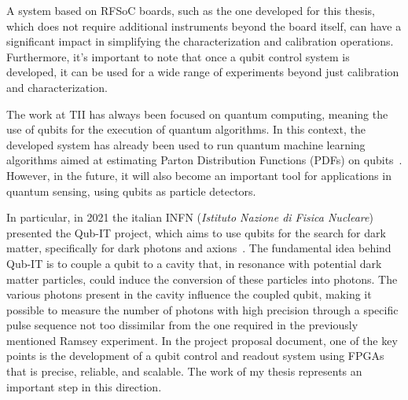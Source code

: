 %
A system based on RFSoC boards, such as the one developed for this thesis, which does not require additional instruments beyond the board itself, can have a significant impact in simplifying the characterization and calibration operations.\\
Furthermore, it's important to note that once a qubit control system is developed, it can be used for a wide range of experiments beyond just calibration and characterization.

%
The work at TII has always been focused on quantum computing, meaning the use of qubits for the execution of quantum algorithms.
In this context, the developed system has already been used to run quantum machine learning algorithms aimed at estimating Parton Distribution Functions (PDFs) on qubits~\cite{Robbiati2023}.
%
However, in the future, it will also become an important tool for applications in quantum sensing, using qubits as particle detectors.

%
In particular, in 2021 the italian INFN (\textit{Istituto Nazione di Fisica Nucleare}) presented the Qub-IT project, which aims to use qubits for the search for dark matter, specifically for dark photons and axions~\cite{qubit_project}.
The fundamental idea behind Qub-IT is to couple a qubit to a cavity that, in resonance with potential dark matter particles, could induce the conversion of these particles into photons.
The various photons present in the cavity influence the coupled qubit, making it possible to measure the number of photons with high precision through a specific pulse sequence not too dissimilar from the one required in the previously mentioned Ramsey experiment.
%
In the project proposal document, one of the key points is the development of a qubit control and readout system using FPGAs that is precise, reliable, and scalable.
%
The work of my thesis represents an important step in this direction.

